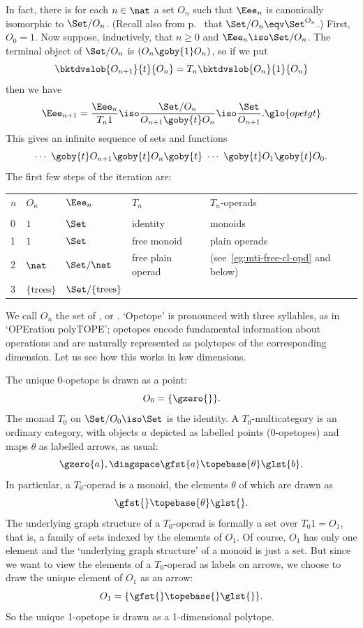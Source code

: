 In fact, there is for each $n\in\nat$ a set $O_n$%
% 
% 
such that $\Eee_n$ is
canonically isomorphic to $\Set/O_n$.  (Recall also from
p.~\pageref{eq:Set-slice-power} that $\Set/O_n \eqv \Set^{O_n}$.)  First,
$O_0 = 1$.  Now suppose, inductively, that $n\geq 0$ and $\Eee_n \iso
\Set/O_n$.  The terminal object of $\Set/O_n$ is $(O_n \goby{1} O_n)$, so
if we put
\[
\bktdvslob{O_{n+1}}{t}{O_n} = T_n \bktdvslob{O_n}{1}{O_n}
\]
then we have
\[
\Eee_{n+1} = 
\frac{\Eee_n}{T_n 1} \iso
\frac{\Set/O_n}{O_{n+1} \goby{t} O_n} \iso
\frac{\Set}{O_{n+1}}.%
% 
\glo{opetgt}
% 
\]
This gives an infinite sequence of sets and functions
\[
\cdots 
\ 
\goby{t} 
O_{n+1} 
\goby{t} 
O_n 
\goby{t} 
\ 
\cdots
\ 
\goby{t} 
O_1 
\goby{t} 
O_0.
\]
The first few steps of the iteration are:
%
\begin{center}
\begin{tabular}{lllll}
$n$	&$O_n$		&$\Eee_n$	&$T_n$		&$T_n$-operads	\\
	&		&		&		&		\\
0	&$1$		&$\Set$		&identity	&monoids	\\
1	&$1$		&$\Set$		&free monoid	&
					plain operads		\\
2	&$\nat$&
			$\Set/\nat$	&free plain operad&
				(see~\ref{eg:mti-free-cl-opd} and below)\\
3	&$\{\textrm{trees}\}$&
		$\Set/\{\textrm{trees}\}$
\end{tabular}
\end{center}
%

We call $O_n$ the set of ,%
%
%
or
.  `Opetope' is pronounced%
%
%
with three syllables, as in
`OPEration polyTOPE'; opetopes encode fundamental
information about operations and are naturally represented as polytopes of
the corresponding dimension.  Let us see how this works in low dimensions.

The unique 0-opetope is drawn as a point:
\[
O_0 = \{ \gzero{} \}.
\]
The monad $T_0$ on $\Set/O_0 \iso \Set$ is the identity.  A
$T_0$-multicategory is an ordinary category, with objects $a$ depicted as
labelled points (0-opetopes) and maps $\theta$ as labelled arrows, as
usual:
\[
\gzero{a},
\diagspace
\gfst{a} \topebase{\theta} \glst{b}.
\]
In particular, a $T_0$-operad is a monoid, the elements $\theta$ of which
are drawn as
\[
\gfst{} \topebase{\theta} \glst{}.
\]
The underlying graph structure of a $T_0$-operad is formally a set over
$T_0 1 = O_1$, that is, a family of sets indexed by the elements of $O_1$.
Of course, $O_1$ has only one element and the `underlying graph structure'
of a monoid is just a set.  But since we want to view the elements of a
$T_0$-operad as labels on arrows, we choose to draw the unique element of
$O_1$ as an arrow:
\[
O_1 = \{ \gfst{}\topebase{}\glst{} \}.
\]
So the unique 1-opetope is drawn as a 1-dimensional polytope.

